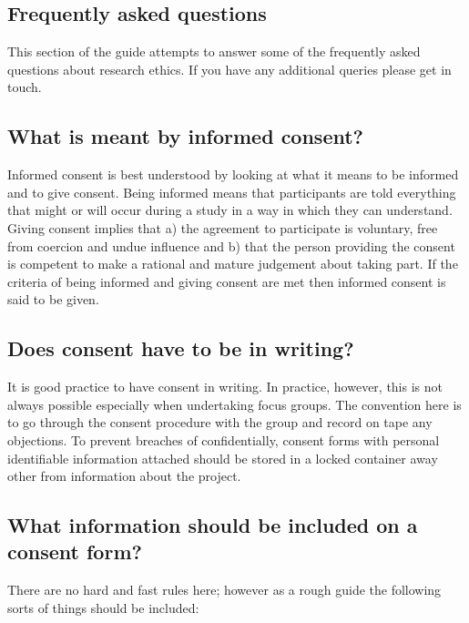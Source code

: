 \subsection{Frequently asked questions}

This section of the guide attempts to answer some of the frequently asked questions about research ethics. If you have any additional queries please get in touch. 

\subsection{What is meant by informed consent?}

Informed consent is best understood by looking at what it means to be informed and to give consent. Being informed means that participants are told everything that might or will occur during a study in a way in which they can understand. Giving consent implies that a) the agreement to participate is voluntary, free from coercion and undue influence and b) that the person providing the consent is competent to make a rational and mature judgement about taking part. If the criteria of being informed and giving consent are met then informed consent is said to be given.

\subsection{Does consent have to be in writing?}

It is good practice to have consent in writing. In practice, however, this is not always possible especially when undertaking focus groups. The convention here is to go through the consent procedure with the group and record on tape any objections. To prevent breaches of confidentially, consent forms with personal identifiable information attached should be stored in a locked container away other from information about the project.

\subsection{What information should be included on a consent form?}

There are no hard and fast rules here; however as a rough guide the following sorts of things should be included:

